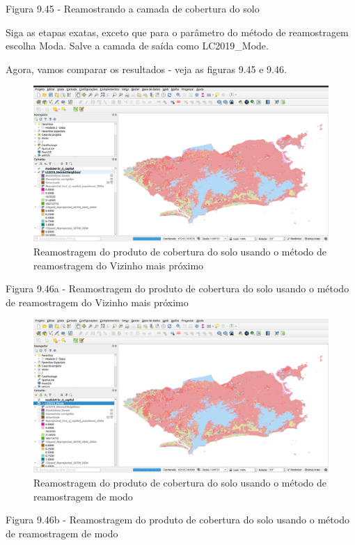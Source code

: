 \documentclass[
]{krantz}
\begin{document}
Figura 9.45 - Reamostrando a camada de cobertura do solo

Siga as etapas exatas, exceto que para o parâmetro do método de reamostragem escolha Moda. Salve a camada de saída como LC2019\_Mode.

Agora, vamos comparar os resultados - veja as figuras 9.45 e 9.46.

\begin{figure}
\centering
\includegraphics{media/modulo9/fig946_a.png}
\caption{Reamostragem do produto de cobertura do solo usando o método de reamostragem do Vizinho mais próximo}
\end{figure}

Figura 9.46a - Reamostragem do produto de cobertura do solo usando o método de reamostragem do Vizinho mais próximo

\begin{figure}
\centering
\includegraphics{media/modulo9/fig946_b.png}
\caption{Reamostragem do produto de cobertura do solo usando o método de reamostragem de modo}
\end{figure}

Figura 9.46b - Reamostragem do produto de cobertura do solo usando o método de reamostragem de modo
\end{document}
